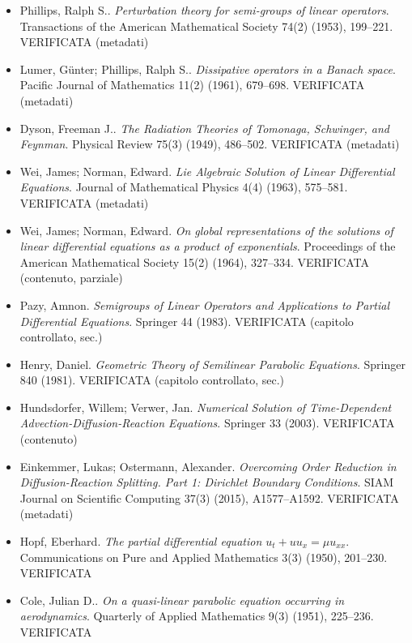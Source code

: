\documentclass[11pt]{article}
\theoremstyle{plain}
\theoremstyle{definition}
\theoremstyle{remark}
\begin{document}
\begin{itemize}[itemsep=2pt,leftmargin=1.2em,font=\small]
\item Phillips, Ralph S.. \emph{Perturbation theory for semi-groups of linear operators}. Transactions of the American Mathematical Society 74(2) (1953), 199--221. \textsf{\footnotesize VERIFICATA (metadati)}
\item Lumer, G{\"u}nter; Phillips, Ralph S.. \emph{Dissipative operators in a {B}anach space}. Pacific Journal of Mathematics 11(2) (1961), 679--698. \textsf{\footnotesize VERIFICATA (metadati)}
\item Dyson, Freeman J.. \emph{The Radiation Theories of {T}omonaga, {S}chwinger, and {F}eynman}. Physical Review 75(3) (1949), 486--502. \textsf{\footnotesize VERIFICATA (metadati)}
\item Wei, James; Norman, Edward. \emph{Lie Algebraic Solution of Linear Differential Equations}. Journal of Mathematical Physics 4(4) (1963), 575--581. \textsf{\footnotesize VERIFICATA (metadati)}
\item Wei, James; Norman, Edward. \emph{On global representations of the solutions of linear differential equations as a product of exponentials}. Proceedings of the American Mathematical Society 15(2) (1964), 327--334. \textsf{\footnotesize VERIFICATA (contenuto, parziale)}
\item Pazy, Amnon. \emph{Semigroups of Linear Operators and Applications to Partial Differential Equations}. Springer 44 (1983). \textsf{\footnotesize VERIFICATA (capitolo controllato, sec.)}
\item Henry, Daniel. \emph{Geometric Theory of Semilinear Parabolic Equations}. Springer 840 (1981). \textsf{\footnotesize VERIFICATA (capitolo controllato, sec.)}
\item Hundsdorfer, Willem; Verwer, Jan. \emph{Numerical Solution of Time-Dependent Advection-Diffusion-Reaction Equations}. Springer 33 (2003). \textsf{\footnotesize VERIFICATA (contenuto)}
\item Einkemmer, Lukas; Ostermann, Alexander. \emph{Overcoming Order Reduction in Diffusion-Reaction Splitting. {P}art 1: {D}irichlet Boundary Conditions}. SIAM Journal on Scientific Computing 37(3) (2015), A1577--A1592. \textsf{\footnotesize VERIFICATA (metadati)}
\item Hopf, Eberhard. \emph{The partial differential equation $u_t + uu_x = \mu u_{xx}$}. Communications on Pure and Applied Mathematics 3(3) (1950), 201--230. \textsf{\footnotesize VERIFICATA}
\item Cole, Julian D.. \emph{On a quasi-linear parabolic equation occurring in aerodynamics}. Quarterly of Applied Mathematics 9(3) (1951), 225--236. \textsf{\footnotesize VERIFICATA}

\end{itemize}
\end{document}
